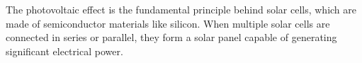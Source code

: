 The photovoltaic effect is the fundamental principle behind solar cells, which are made of semiconductor materials like silicon. When multiple solar cells are connected in series or parallel, they form a solar panel capable of generating significant electrical power.

